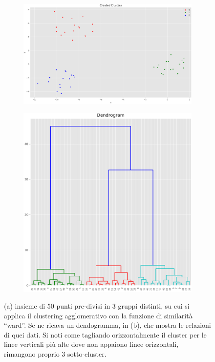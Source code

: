 \documentclass{llncs}
\begin{document}
	\begin{figure}[h]
		\centering
		\begin{subfigure}[b]{\textwidth}
		   	\includegraphics[width=\linewidth]{immagini/created_cluster_dend_ex.png}
		   	\label{fig:1} 
		\end{subfigure}
		
		\begin{subfigure}[b]{\textwidth}
			\centering
		   	\includegraphics[scale=0.5]{immagini/dendrogam_example.png}
		   	\label{fig:2}
		\end{subfigure}
		
		\caption{(a) insieme di 50 punti pre-divisi in 3 gruppi distinti, su cui si applica il clustering agglomerativo con la funzione di 
		similarità ``ward''. Se ne ricava un dendogramma, in (b), che mostra le relazioni di quei dati. Si noti come tagliando orizzontalmente il cluster per le linee verticali più alte dove non appaiono linee orizzontali, rimangono proprio 3 sotto-cluster.}
		\label{ex:dendrogram}
	\end{figure}
\end{document}

